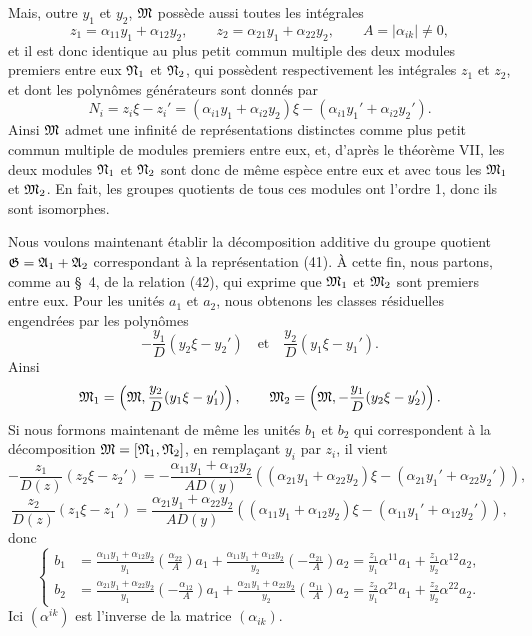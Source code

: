 Mais, outre $y_1$ et $y_2$, $\mathfrak{M}$ possède aussi toutes les intégrales
\[
 z_1=\alpha_{11}y_1+\alpha_{12}y_2,
 \qquad
 z_2=\alpha_{21}y_1+\alpha_{22}y_2,
 \qquad
 A=|\alpha_{ik}|\ne0,
\]
et il est donc identique au plus petit commun multiple des deux modules premiers entre eux $\mathfrak{N}_1$ et $\mathfrak{N}_2$, qui possèdent respectivement les intégrales $z_1$ et $z_2$, et dont les polynômes générateurs sont donnés par
\[
 N_i=z_i\xi-z_i'=(\alpha_{i1}y_1+\alpha_{i2}y_2)\xi-(\alpha_{i1}y_1'+\alpha_{i2}y_2').
\]
Ainsi $\mathfrak{M}$ admet une infinité de représentations distinctes comme plus petit commun multiple de modules premiers entre eux, et, d'après le théorème VII, les deux modules $\mathfrak{N}_1$ et $\mathfrak{N}_2$ sont donc de même espèce entre eux et avec tous les $\mathfrak{M}_1$ et $\mathfrak{M}_2$. En fait, les groupes quotients de tous ces modules ont l'ordre 1, donc ils sont isomorphes.

Nous voulons maintenant établir la décomposition additive du groupe quotient $\mathfrak{G}=\mathfrak{A}_1+\mathfrak{A}_2$ correspondant à la représentation (41). À cette fin, nous partons, comme au \S~4, de la relation (42), qui exprime que $\mathfrak{M}_1$ et $\mathfrak{M}_2$ sont premiers entre eux. Pour les unités $a_1$ et $a_2$, nous obtenons les classes résiduelles engendrées par les polynômes
\[
 -\frac{y_1}{D}(y_2\xi-y_2')
 \quad\text{et}\quad
 \frac{y_2}{D}(y_1\xi-y_1').
\]
Ainsi
\[
 \mathfrak{M}_1=\left(\mathfrak{M},\frac{y_2}{D}(y_1\xi-y_1')\right),
 \qquad
 \mathfrak{M}_2=\left(\mathfrak{M},-\frac{y_1}{D}(y_2\xi-y_2')\right).
\]
Si nous formons maintenant de même les unités $b_1$ et $b_2$ qui correspondent à la décomposition $\mathfrak{M}=[\mathfrak{N}_1,\mathfrak{N}_2]$, en remplaçant $y_i$ par $z_i$, il vient
\[
 -\frac{z_1}{D(z)}(z_2\xi-z_2')
 =-\frac{\alpha_{11}y_1+\alpha_{12}y_2}{AD(y)}
 ((\alpha_{21}y_1+\alpha_{22}y_2)\xi-(\alpha_{21}y_1'+\alpha_{22}y_2')),
\]
\[
 \frac{z_2}{D(z)}(z_1\xi-z_1')
 =\frac{\alpha_{21}y_1+\alpha_{22}y_2}{AD(y)}
 ((\alpha_{11}y_1+\alpha_{12}y_2)\xi-(\alpha_{11}y_1'+\alpha_{12}y_2')),
\]
donc
\begin{equation}
\left\{
\begin{aligned}
 b_1&=\frac{\alpha_{11}y_1+\alpha_{12}y_2}{y_1}
 \left(\frac{\alpha_{22}}{A}\right)a_1
 +\frac{\alpha_{11}y_1+\alpha_{12}y_2}{y_2}
 \left(-\frac{\alpha_{21}}{A}\right)a_2
 =\frac{z_1}{y_1}\alpha^{11}a_1+\frac{z_1}{y_2}\alpha^{12}a_2,\\
 b_2&=\frac{\alpha_{21}y_1+\alpha_{22}y_2}{y_1}
 \left(-\frac{\alpha_{12}}{A}\right)a_1
 +\frac{\alpha_{21}y_1+\alpha_{22}y_2}{y_2}
 \left(\frac{\alpha_{11}}{A}\right)a_2
 =\frac{z_2}{y_1}\alpha^{21}a_1+\frac{z_2}{y_2}\alpha^{22}a_2.
\end{aligned}\right.
\tag{43}
\end{equation}
Ici $(\alpha^{ik})$ est l'inverse de la matrice $(\alpha_{ik})$.

